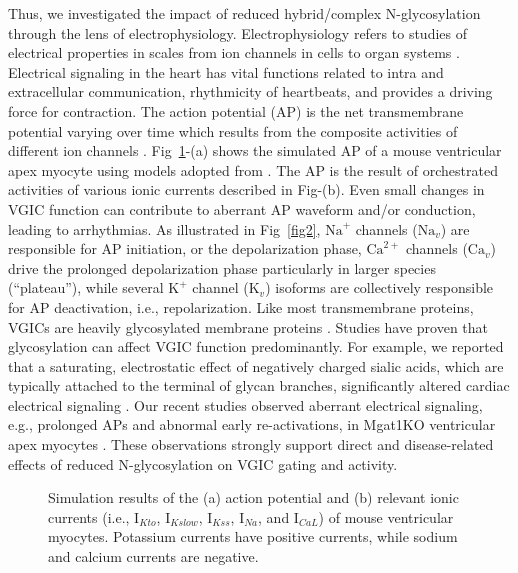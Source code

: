 \documentclass[10pt,letterpaper]{article}
\begin{document}
Thus, we investigated the impact of reduced hybrid/complex N-glycosylation through the lens of electrophysiology. Electrophysiology refers to studies of electrical properties in scales from ion channels in cells to organ systems \cite{scanziani2009electrophysiology}. Electrical signaling in the heart has vital functions related to intra and extracellular communication, rhythmicity of heartbeats, and provides a driving force for contraction. The action potential (AP) is the net transmembrane potential varying over time which results from the composite activities of different ion channels \cite{grant2009cardiac}. Fig~\ref{fig1}-(a) shows the simulated AP of a mouse ventricular apex myocyte using models adopted from \cite{bondarenko2004computer}. The AP is the result of orchestrated activities of various ionic currents described in Fig-(b). Even small changes in VGIC function can contribute to aberrant AP waveform and/or conduction, leading to arrhythmias. As illustrated in Fig~\ref{fig2}, $\text{Na}^{+}$ channels ($\text{Na}_{v}$) are responsible for AP initiation, or the depolarization phase, $\text{Ca}^{2+}$ channels ($\text{Ca}_{v}$) drive the prolonged depolarization phase particularly in larger species (“plateau”), while several $\text{K}^{+}$ channel ($\text{K}_{v}$) isoforms are collectively responsible for AP deactivation, i.e., repolarization. Like most transmembrane proteins, VGICs are heavily glycosylated membrane proteins \cite{ednie2011modulation}. Studies have proven that glycosylation can affect VGIC function predominantly. For example, we reported that a saturating, electrostatic effect of negatively charged sialic acids, which are typically attached to the terminal of glycan branches, significantly altered cardiac electrical signaling \cite{ednie2013expression, ednie2015reduced}. Our recent studies observed aberrant electrical signaling, e.g., prolonged APs and abnormal early re-activations, in Mgat1KO ventricular apex myocytes \cite{ednie2019reduced, ednie2019reduced2}. These observations strongly support direct and disease-related effects of reduced N-glycosylation on VGIC gating and activity.

\begin{figure}[!ht]
    \centering
    \caption{Simulation results of the (a) action potential and (b) relevant ionic currents (i.e., $\text{I}_{Kto}$, $\text{I}_{Kslow}$, $\text{I}_{Kss}$, $\text{I}_{Na}$, and $\text{I}_{CaL}$) of mouse ventricular myocytes. Potassium currents have positive currents, while sodium and calcium currents are negative.}
    \label{fig1}
\end{figure}
\end{document}
